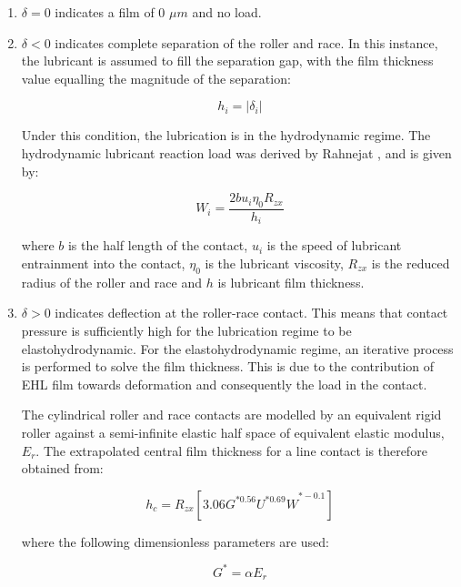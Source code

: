 \begin{enumerate}
	\item $\delta=0$ indicates a film of 0 $\mu m$ and no load.
	\item $\delta<0$ indicates complete separation of the roller and race. In this instance, the lubricant is assumed to fill the separation gap, with the film thickness value equalling the magnitude of the separation:
	
	\begin{equation}\label{hydrodynamic film thickness}
		h_i=\left|\delta_i\right|
	\end{equation}

	Under this condition, the lubrication is in the hydrodynamic regime. The hydrodynamic lubricant reaction load was derived by Rahnejat \cite{Rahnejat1984}, and is given by:
	
	\begin{equation}\label{hydrodynamic reaction load}
		W_i=\frac{2 b u_i \eta_0 R_{z x}}{h_i}
	\end{equation}

	where $b$ is the half length of the contact, $u_i$ is the speed of lubricant entrainment into the contact, $\eta_0$ is the lubricant viscosity, $R_{zx}$ is the reduced radius of the roller and race and $h$ is lubricant film thickness. 
	
	\item $\delta>0$ indicates deflection at the roller-race contact. This means that contact pressure is sufficiently high for the lubrication regime to be elastohydrodynamic. For the elastohydrodynamic regime, an iterative process is performed to solve the film thickness. This is due to the contribution of EHL film towards deformation and consequently the load in the contact.
	
	The cylindrical roller and race contacts are modelled by an equivalent rigid roller against a semi-infinite elastic half space of equivalent elastic modulus, $E_r$. The extrapolated central film thickness for a line contact is therefore obtained \cite{Dowson1979} from:  
	
	\begin{equation}\label{dimensionless central film thickness}
	h_c=R_{zx}\left[{3.06G}^{\ast0.56}{U^{\ast0.69}W}^{\ast-0.1}\right]
    \end{equation}

	where the following dimensionless parameters are used:
		
	\begin{equation}\label{Gstar}
		G^*=\alpha E_r 
	\end{equation}
	

\end{enumerate}

